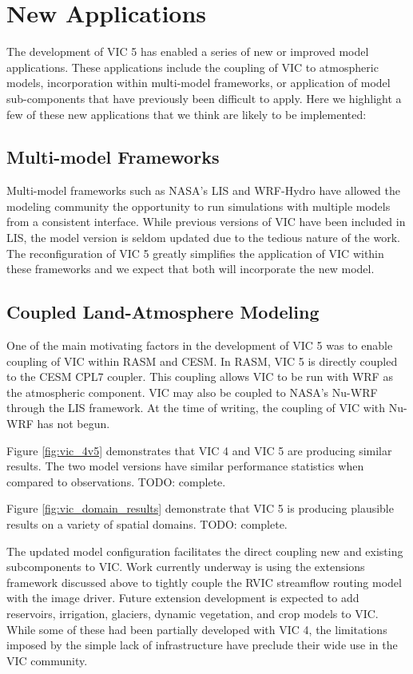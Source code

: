 \documentclass[gmd, manuscript]{copernicus}
\begin{document}
\section{New Applications}
  The development of VIC 5 has enabled a series of new or improved model applications.
  These applications include the coupling of VIC to atmospheric models, incorporation within multi-model frameworks, or application of model sub-components that have previously been difficult to apply.
  Here we highlight a few of these new applications that we think are likely to be implemented:

  \subsection{Multi-model Frameworks}
    Multi-model frameworks such as NASA's LIS \citep{Kumar_2006} and WRF-Hydro \citep{Gochis_2013} have allowed the modeling community the opportunity to run simulations with multiple models from a consistent interface.
    While previous versions of VIC have been included in LIS, the model version is seldom updated due to the tedious nature of the work.
    The reconfiguration of VIC 5 greatly simplifies the application of VIC within these frameworks and we expect that both will incorporate the new model.

  \subsection{Coupled Land-Atmosphere Modeling}
    One of the main motivating factors in the development of VIC 5 was to enable coupling of VIC within RASM and CESM.
    In RASM, VIC 5 is directly coupled to the CESM CPL7 coupler.
    This coupling allows VIC to be run with WRF as the atmospheric component.
    VIC may also be coupled to NASA's Nu-WRF through the LIS framework.
    At the time of writing, the coupling of VIC with Nu-WRF has not begun.

  Figure \ref{fig:vic_4v5} demonstrates that VIC 4 and VIC 5 are producing similar results.
  The two model versions have similar performance statistics when compared to observations.
  TODO: complete.

  Figure \ref{fig:vic_domain_results} demonstrate that VIC 5 is producing plausible results on a variety of spatial domains.
  TODO: complete.

  The updated model configuration facilitates the direct coupling new and existing subcomponents to VIC.
  Work currently underway is using the extensions framework discussed above to tightly couple the RVIC streamflow routing model with the image driver.
  Future extension development is expected to add reservoirs, irrigation, glaciers, dynamic vegetation, and crop models to VIC.
  While some of these had been partially developed with VIC 4, the limitations imposed by the simple lack of infrastructure have preclude their wide use in the VIC community.
\end{document}

